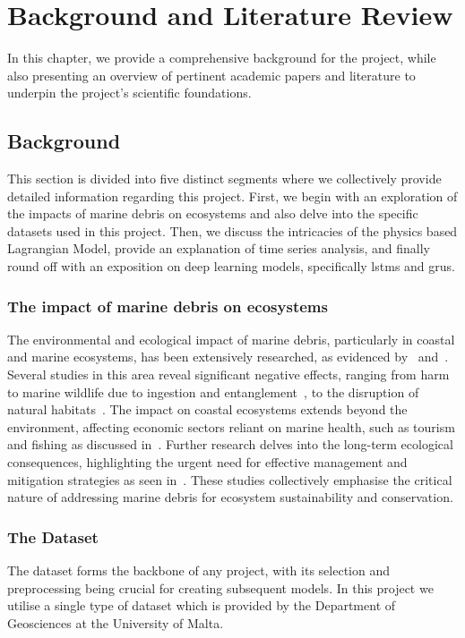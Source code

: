 \graphicspath{{content/chapters/2_background_and_literature_review/b_l_r_figures}}

\chapter{Background and Literature Review}
\label{chp:background_and_literature_review}
In this chapter, we provide a comprehensive background for the project, while also presenting an overview of pertinent academic papers and literature to underpin the project’s scientific foundations.

\section{Background}
\label{sec:background}
This section is divided into five distinct segments where we collectively provide detailed information regarding this project. First, we begin with an exploration of the impacts of marine debris on ecosystems and also delve into the specific datasets used in this project. Then, we discuss the intricacies of the physics based Lagrangian Model, provide an explanation of time series analysis, and finally round off with an exposition on deep learning models, specifically \acrshort{lstm}s and \acrshort{gru}s.

\subsection{The impact of marine debris on ecosystems}
\label{subsec:2.1.1}
The environmental and ecological impact of marine debris, particularly in coastal and marine ecosystems, has been extensively researched, as evidenced by~\cite{6} and~\cite{7}. Several studies in this area reveal significant negative effects, ranging from harm to marine wildlife due to ingestion and entanglement~\cite{8}, to the disruption of natural habitats~\cite{9}. The impact on coastal ecosystems extends beyond the environment, affecting economic sectors reliant on marine health, such as tourism and fishing as discussed in~\cite{9}. Further research delves into the long-term ecological consequences, highlighting the urgent need for effective management and mitigation strategies as seen in~\cite{10}. These studies collectively emphasise the critical nature of addressing marine debris for ecosystem sustainability and conservation. 

\subsection{The Dataset}
\label{subsec:2.1.2}
The dataset forms the backbone of any project, with its selection and preprocessing being crucial for creating subsequent models. In this project we utilise a single type of dataset which is provided by the Department of Geosciences at the University of Malta.

